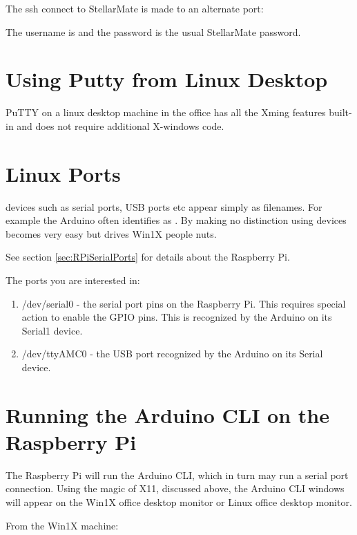 The ssh connect to StellarMate is made to an alternate port:


The username is  and the password is the usual
StellarMate password.

\section{Using Putty from Linux Desktop} \label{sec:PuttyLinuxDesktop}

PuTTY on a linux desktop machine in the office has all the Xming features
built-in and does not require additional X-windows code.

\section{Linux Ports}

devices such as serial ports, USB ports etc appear simply as
filenames.  For example the Arduino often identifies as
. By making no distinction using devices becomes
very easy but drives Win1X people nuts.

See section \ref{sec:RPiSerialPorts} for details about the Raspberry Pi.

The ports you are interested in:

\vspace{-.15cm}
\begin{enumerate}\addtolength{\itemsep}{-0.5\baselineskip}
   \item   /dev/serial0 - the serial port pins on the Raspberry Pi. This requires 
special action to enable the GPIO pins. This is recognized by the Arduino on its Serial1
 device.
   \item   /dev/ttyAMC0 - the USB port recognized by the Arduino on its Serial
 device.
\end{enumerate}

\section{Running the Arduino CLI on the Raspberry Pi}

The Raspberry Pi will run the Arduino CLI, which in turn may run a
serial port connection. Using the magic of X11, discussed above, the
Arduino CLI windows will appear on the Win1X office desktop monitor or
Linux office desktop monitor.

From the Win1X machine:

